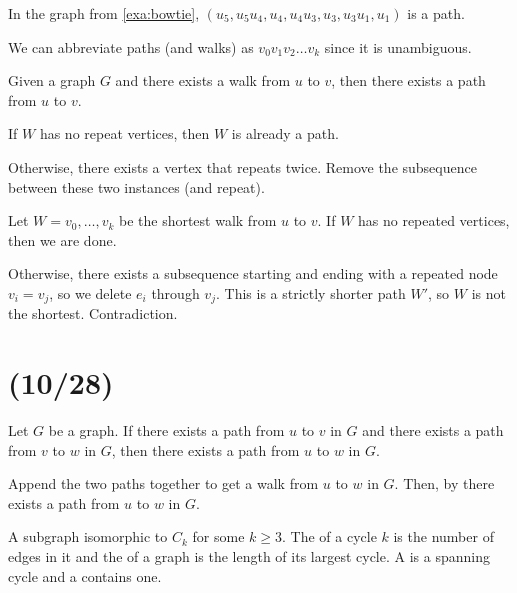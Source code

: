 \begin{example}
  In the graph from \cref{exa:bowtie}, $(u_5,u_5u_4,u_4,u_4u_3,u_3,u_3u_1,u_1)$ is a path.
\end{example}

We can abbreviate paths (and walks) as $v_0v_1v_2\dots v_k$ since it is unambiguous.

\begin{theorem}[4.6.2]\label{thm:pathwalk}
  Given a graph $G$ and there exists a walk from $u$ to $v$,
  then there exists a path from $u$ to $v$.
\end{theorem}
\begin{prf}[informal]
  If $W$ has no repeat vertices, then $W$ is already a path.

  Otherwise, there exists a vertex that repeats twice.
  Remove the subsequence between these two instances (and repeat).
\end{prf}
\begin{prf}
  Let $W = v_0,\dotsc,v_k$ be the shortest walk from $u$ to $v$.
  If $W$ has no repeated vertices, then we are done.

  Otherwise, there exists a subsequence starting and ending with a repeated
  node $v_i = v_j$, so we delete $e_i$ through $v_j$.
  This is a strictly shorter path $W'$, so $W$ is not the shortest. Contradiction.
\end{prf}

\section{(10/28)}

\begin{corollary}[4.6.3]\label{cor:463}
  Let $G$ be a graph. If there exists a path from $u$ to $v$ in $G$
  and there exists a path from $v$ to $w$ in $G$,
  then there exists a path from $u$ to $w$ in $G$.
\end{corollary}
\begin{prf}
  Append the two paths together to get a walk from $u$ to $w$ in $G$.
  Then, by  there exists a path from $u$ to $w$ in $G$.
\end{prf}

\begin{defn}[cycle]
  A subgraph isomorphic to $C_k$ for some $k \geq 3$.
  The  of a cycle $k$ is the number of edges in it
  and the  of a graph is the length of its largest cycle.
  A  is a spanning cycle
  and a  contains one.
\end{defn}

